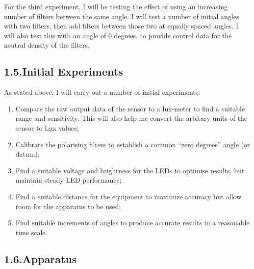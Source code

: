\documentclass{article}
\begin{document}
\noindent{}For the third experiment, I will be testing the effect of using an increasing number of filters between the same angle. I will test a number of initial angles with two filters, then add filters between those two at equally spaced angles. I will also test this with an angle of 0 degrees, to provide control data for the neutral density of the filters.%

\subsection{1.5.\hspace*{0.5em}Initial Experiments}\label{sec-initial-experiments}%

\noindent{}As stated above, I will carry out a number of initial experiments:%

\begin{enumerate}%

\item{}
Compare the raw output data of the sensor to a lux-meter to find a suitable range and sensitivity. This will also help me convert the arbitary units of the sensor to Lux values;%

\item{}
Calibrate the polarising filters to establish a common \textquotedblleft{}zero degrees\textquotedblright{} angle (or datum);%

\item{}
Find a suitable voltage and brightness for the LEDs to optimise results, but maintain steady LED performance;%

\item{}
Find a suitable distance for the equipment to maximize accuracy but allow room for the apparatus to be used;%

\item{}
Find suitable increments of angles to produce accurate results in a reasonable time scale.%
\end{enumerate}%

\subsection{1.6.\hspace*{0.5em}Apparatus}\label{sec-apparatus}%
\end{document}
